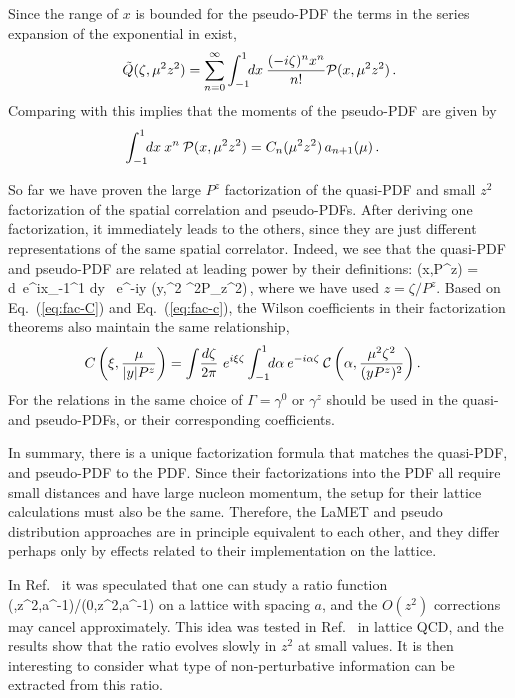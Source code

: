 Since the range of $x$ is bounded for the pseudo-PDF the terms in the series expansion of the exponential in  exist,
\begin{align}
  \tilde Q(\zeta,\mu^2 z^2)
   = \sum_{n=0}^\infty \int_{-1}^{1}\!\! dx\: \frac{(-i\zeta)^n x^n}{n!}
     {\cal P}(x,\mu^2 z^2) \,.
\end{align}
Comparing with  this implies that the moments of the pseudo-PDF are given by
\begin{align}  \label{eq:Pmoment}
  \int_{-1}^{1}\!\! dx\: x^n \:  {\cal P}(x,\mu^2 z^2)
  &= C_n(\mu^2 z^2)\, a_{n+1}(\mu) \,.
\end{align}

So far we have proven the large $P^z$ factorization of the quasi-PDF and small $z^2$ factorization of the spatial correlation and pseudo-PDFs. After
deriving one factorization, it immediately leads to the others, since they are just different representations of the same spatial correlator. Indeed, we see that the quasi-PDF and pseudo-PDF are related at leading power by their definitions:
\beq \label{eq:equiv}
\Bigl(x,{\mu\over P^z}\Bigr)
  = \int\! {d\zeta{}\pi}\ e^{ix\zeta}\int_{-1}^1\!\! dy \ e^{-iy\zeta}
  \: \biggl(y,{\mu^2 \zeta^2\over P_z^2}\biggr)\,,
\eeq
where we have used $z=\zeta/P^z$.
Based on Eq.~(\ref{eq:fac-C}) and Eq.~(\ref{eq:fac-c}), the Wilson coefficients in their factorization theorems also maintain the same relationship,
\begin{align} \label{eq:ftc-C}
 C\left(\xi,{\mu\over |y|P^z}\right)
  &= \int\! {d\zeta\over 2\pi}\ e^{i\xi\zeta}\int_{-1}^1\!\! d\alpha\: e^{-i\alpha\zeta}\: \mathcal{C}\left(\alpha,{\mu^2 \zeta^2\over (yP^z)^2}\right) .
\end{align}
For the relations in  the same choice of $\Gamma=\gamma^0$ or $\gamma^z$ should be used in the quasi- and pseudo-PDFs, or their corresponding coefficients.

In summary, there is a unique factorization formula that matches the quasi-PDF, \spcorr and pseudo-PDF to the PDF. Since their factorizations into the PDF all require small distances and have large nucleon momentum, the setup for their lattice calculations must also be the same. Therefore, the LaMET and pseudo distribution approaches are in principle equivalent to each other, and they differ perhaps only by effects related to their implementation on the lattice.

In Ref.~\cite{Radyushkin:2017cyf} it was speculated that one can study a ratio function
\beq \label{eq:ratio}
(\zeta,z^2,a^{-1})/(0,z^2,a^{-1})
\eeq
on a lattice with spacing $a$, and the $O(z^2)$ corrections may cancel approximately. This idea was tested in Ref.~\cite{Orginos:2017kos} in lattice QCD, and the results show that the ratio evolves slowly in $z^2$ at small values. It is then interesting to consider what type of non-perturbative information can be extracted from this ratio.

